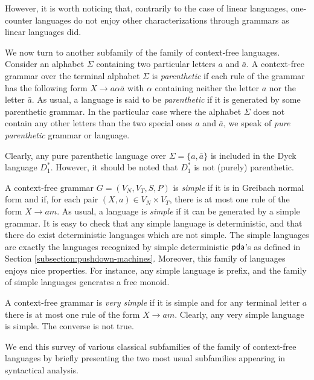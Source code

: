 However, it is worth noticing that, contrarily to the case of linear languages, one-counter languages do not enjoy other characterizations through grammars as linear languages did.

We now turn to another subfamily of the family of context-free languages. Consider an alphabet $\Sigma$ containing two particular letters $a$ and $\bar{a}$. A context-free grammar over the terminal alphabet $\Sigma$ is \emph{parenthetic} if each rule of the grammar has the following form $X \to a \alpha \bar{a}$ with $\alpha$ containing neither the letter $a$ nor the letter $\bar{a}$. As usual, a language is said to be \emph{parenthetic} if it is generated by some parenthetic grammar. In the particular case where the alphabet $\Sigma$ does not contain any other letters than the two special ones $a$ and $\bar{a}$, we speak of \emph{pure parenthetic} grammar or language.

Clearly, any pure parenthetic language over $\Sigma = \{a, \bar{a}\}$ is included in the Dyck language $D_1^*$. However, it should be noted that $D_1^*$ is not (purely) parenthetic.

A context-free grammar $G = (V_N, V_T, S, P)$ is  \emph{simple} if it is in  Greibach normal form and if, for each pair $(X, a) \in V_N \times V_T$, there is at most one rule of the form $X \to am$. As usual, a language is \emph{simple} if it can be generated by a simple grammar. It is easy to check that any simple language is deterministic, and that there do exist deterministic languages which are not simple. The simple languages are exactly the languages recognized by  simple deterministic \index{$\pda$}$\pda$'s as defined in Section \ref{subsection:pushdown-machines}. Moreover, this family of languages enjoys nice properties. For instance, any simple language is prefix, and the family of simple languages generates a free monoid.

A context-free grammar is \emph{very simple} if it is simple and for any terminal letter $a$ there is at most one rule of the form $X \to am$. Clearly, any very simple language is simple. The converse is not true.

We end this survey of various classical subfamilies of the family of context-free languages by briefly presenting the two most usual subfamilies appearing in syntactical analysis.


